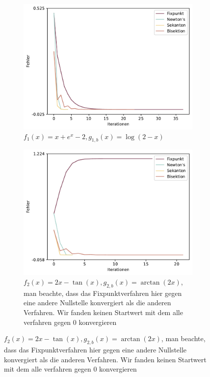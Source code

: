 \documentclass[a4paper,12pt]{article}
\newcommand{\1}{1\hspace{-0,9ex}1}
\begin{document}
\begin{figure}[!h]
	\centering
	\begin{subfigure}[b]{0.4\textwidth}
		\caption*{$f_1(x) = x + e^x-2, g_{1,b}(x)=\log(2-x)$}
		\includegraphics[width=\textwidth]{plots/error_series_plot.pdf}
	\end{subfigure}
	\begin{subfigure}[b]{0.4\textwidth}
		\caption*{$f_2(x) = 2x - \tan(x), g_{2,b}(x)=\arctan(2x)$, man beachte, dass das Fixpunktverfahren hier gegen eine andere Nullstelle konvergiert als die anderen Verfahren. Wir fanden keinen Startwert mit dem alle verfahren gegen $0$ konvergieren}
		\includegraphics[width=\textwidth]{plots/error_series_plot(1).pdf}
	\end{subfigure}

\end{figure}
\end{document}
